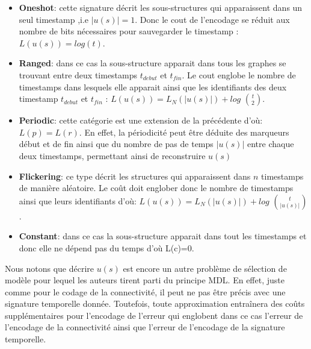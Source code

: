 			 
			 \begin{itemize}[label=$\circ$]
			 \item \textbf{Oneshot}: cette signature décrit les sous-structures qui apparaissent dans un seul timestamp ,i.e $|u(s)|=1$. Donc le cout de l'encodage se réduit aux nombre de bits nécessaires pour sauvegarder le timestamp : $L(u(s)) = log(t)$.
			 \item \textbf{Ranged}: dans ce cas la sous-structure apparait dans tous les graphes se trouvant entre deux timestamps $t_{debut}$ et $t_{fin}$. Le cout englobe le nombre de timestamps dans lesquels elle apparait ainsi que les identifiants des deux timestamp $t_{debut}$ et $t_{fin}$ : $L(u(s)) = L_{N}(|u(s)|) +log$ ${t}\choose{2}$.
			 \item \textbf{Periodic}: cette catégorie est une extension de la précédente d'où: $L(p) = L(r)$.
			 En effet, la périodicité peut être déduite des marqueurs début et de fin ainsi que du nombre de pas de temps $|u(s)|$ entre chaque deux timestamps, permettant ainsi de reconstruire $u(s)$
			 \item \textbf{Flickering}: ce type décrit les structures qui apparaissent dans $n$ timestamps de manière aléatoire. Le coût doit englober donc le nombre de timestamps ainsi que leurs identifiants d'où: 
			 $L(u(s)) = L_{N}(|u(s)|) +log$ ${t}\choose{|u(s)|}$.
			 \item \textbf{Constant}: dans ce cas la sous-structure apparait dans tout les timestamps et donc elle ne dépend pas du temps d'où L(c)=0.
			 \end{itemize} \label{par:TimeCrunch}
			 
			 
			 Nous notons que décrire $u(s)$ est encore un autre problème de sélection de modèle pour lequel les auteurs tirent parti du principe MDL. En effet, juste comme pour le codage de la connectivité, il peut ne pas être précis avec une signature temporelle donnée. Toutefois, toute approximation entraînera des coûts supplémentaires pour l'encodage de l'erreur qui englobent dans ce cas l'erreur de l'encodage de la connectivité ainsi que l'erreur de l'encodage de la signature temporelle.
			 
